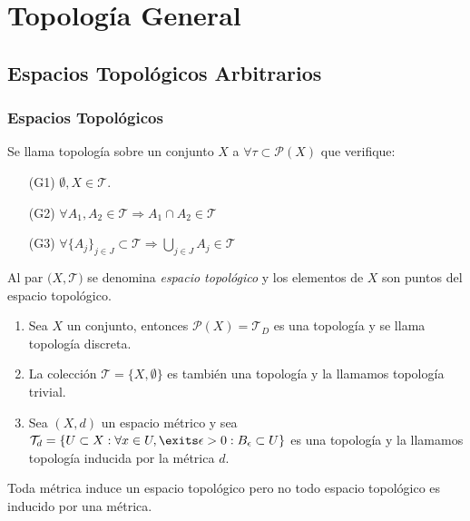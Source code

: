 \part{Topología General}
\chapter{Espacios Topológicos Arbitrarios}
\section{Espacios Topológicos}

\begin{defn}[Topología]
  Se llama topología sobre un conjunto $X$ a $\forall \tau \subset \mathcal{P}(X)$ que verifique:
  \begin{enumerate}[label=(\roman*)]
    \item [(G1)] $\emptyset,X \in \mathcal{T}$.
    \item [(G2)] $\forall A_{1}, A_{2} \in \mathcal{T} \Rightarrow A_{1}\cap A_{2} \in \mathcal{T}$
    \item [(G3)] $\forall \{ A_{j} \}_{j \in J} \subset \mathcal{T} \Rightarrow \bigcup_{j \in J} A_{j} \in \mathcal{T}$
  \end{enumerate}
\end{defn}

\begin{obs}
  Al par $\big( X, \mathcal{T} \big)$ se denomina \textit{espacio topológico} y los elementos de $X$ son puntos del espacio topológico.
\end{obs}

\begin{ejm}
  \begin{enumerate}[label=(\roman*)]
    \item   Sea $X$ un conjunto, entonces $\mathcal{P}(X) = \mathcal{T}_{D}$ es una topología y se llama topología discreta.
    \item  La colección $\mathcal{T} = \{ X, \emptyset \}$ es también una topología y la llamamos topología trivial.
    \item Sea $(X, d)$ un espacio métrico y sea $\mathcal{T}_{d} = \{ U \subset X : \forall x \in U, \exits \epsilon > 0 : B_{\epsilon} \subset U \}$ es una topología y la llamamos topología inducida por la métrica $d$.
  \end{enumerate}
\end{ejm}

\begin{obs}
  Toda métrica induce un espacio topológico pero no todo espacio topológico es inducido por una métrica.
\end{obs}

